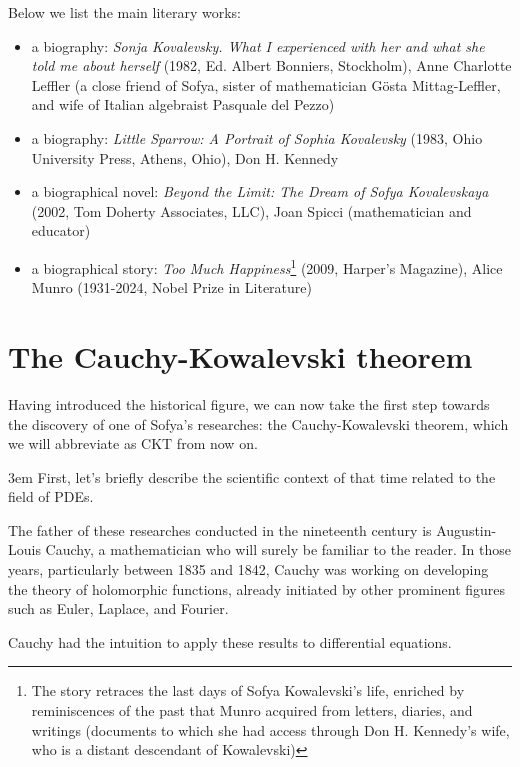 Below we list the main literary works:
\begin{itemize}

\item a biography: \textit{Sonja Kovalevsky. What I experienced with her and what she told me about herself} (1982, Ed. Albert Bonniers, Stockholm), Anne Charlotte Leffler (a close friend of Sofya, sister of mathematician Gösta Mittag-Leffler, and wife of Italian algebraist Pasquale del Pezzo)

\item a biography: \textit{Little Sparrow: A Portrait of Sophia Kovalevsky} (1983, Ohio University Press, Athens, Ohio), Don H. Kennedy

\item a biographical novel: \textit{Beyond the Limit: The Dream of Sofya Kovalevskaya} (2002, Tom Doherty Associates, LLC), Joan Spicci (mathematician and educator)

\item a biographical story: \textit{Too Much Happiness}\footnote{The story retraces the last days of Sofya Kowalevski's life, enriched by reminiscences of the past that Munro acquired from letters, diaries, and writings (documents to which she had access through Don H. Kennedy's wife, who is a distant descendant of Kowalevski)}
(2009, Harper's Magazine), Alice Munro (1931-2024, Nobel Prize in Literature)

\end{itemize}

\section{The Cauchy-Kowalevski theorem}

Having introduced the historical figure, we can now take the first step towards the discovery of one of Sofya's researches: the Cauchy-Kowalevski theorem, which we will abbreviate as CKT from now on.

\emergencystretch 3em
First, let's briefly describe the scientific context of that time related to the field of PDEs.

The father of these researches conducted in the nineteenth century is Augustin-Louis Cauchy, a mathematician who will surely be familiar to the reader. In those years, particularly between 1835 and 1842, Cauchy was working on developing the theory of holomorphic functions, already initiated by other prominent figures such as Euler, Laplace, and Fourier.

Cauchy had the intuition to apply these results to differential equations.

